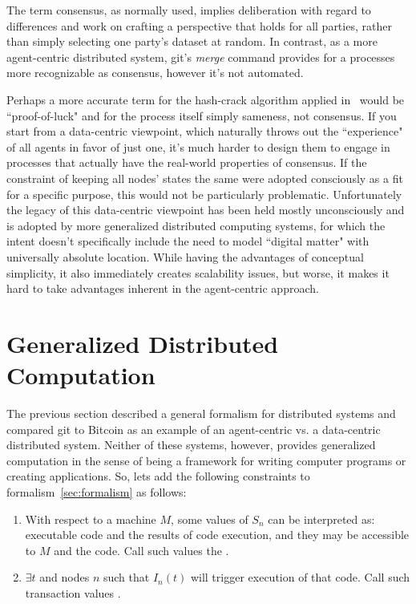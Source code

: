 \documentclass[twocolumn,showpacs,
  nofootinbib,aps,superscriptaddress,
  eqsecnum,prd,notitlepage,showkeys,10pt]{revtex4-1}
\begin{document}
The term consensus, as normally used, implies deliberation with regard to differences and work on crafting a perspective that holds for all parties, rather than simply selecting one party's dataset at random.  In contrast, as a more agent-centric distributed system, git's \textit{merge} command provides for a processes more recognizable as consensus, however it's not automated.

Perhaps a more accurate term for the hash-crack algorithm applied in \sbtc\ would be ``proof-of-luck" and for the process itself simply sameness, not consensus.  If you start from a data-centric viewpoint, which naturally throws out the ``experience" of all agents in favor of just one, it's much harder to design them to engage in processes that actually have the real-world properties of consensus. If the constraint of keeping all nodes' states the same were adopted consciously as a fit for a specific purpose, this would not be particularly problematic.  Unfortunately the legacy of this data-centric viewpoint has been held mostly unconsciously and is adopted by more generalized distributed computing systems, for which the intent doesn't specifically include the need to model ``digital matter" with universally absolute location.  While having the advantages of conceptual simplicity, it also immediately creates scalability issues, but worse, it makes it hard to take advantages inherent in the agent-centric approach.

\section{Generalized Distributed Computation}
\label{sec:dist-comp}

The previous section described a general formalism for distributed systems and compared git to Bitcoin as an example of an agent-centric vs. a data-centric distributed system.  Neither of these systems, however, provides generalized computation in the sense of being a framework for writing computer programs or creating applications. So, lets add the following constraints to formalism~\ref{sec:formalism} as follows:

\begin{enumerate}
\item With respect to a machine $M$, some values of $S_n$ can be interpreted as: executable code and the results of code execution, and they may be accessible to $M$ and the code.  Call such values the .
\item $\exists t$ and nodes $n$ such that $I_n(t)$ will trigger execution of that code. Call such transaction values .
\end{enumerate}
\end{document}

